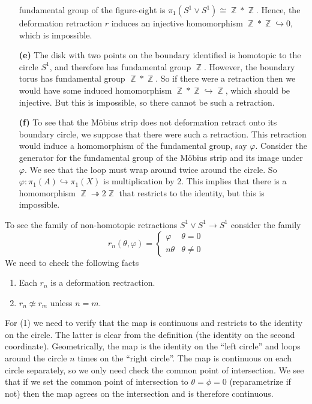 \documentclass{article}
\DeclareMathOperator{\Z}{\mathbb{Z}}
\DeclareMathOperator{\into}{\hookrightarrow}
\DeclareMathOperator{\onto}{\twoheadrightarrow}
\newcommand{\exercise}[1]{\noindent{\textbf{Exercise #1:}}}
\begin{document}
\begin{enumerate}
  fundamental group of the figure-eight is $\pi_1(S^1 \vee S^1) \cong
  \Z \ast \Z$. Hence, the deformation retraction $r$ induces an
  injective homomorphism $\Z \ast \Z \into 0$, which is impossible.
\item[\textbf{(e)}] The disk with two points on the boundary
  identified is homotopic to the circle $S^1$, and therefore has
  fundamental group $\Z$. However, the boundary torus has fundamental
  group $\Z \ast \Z$. So if there were a retraction then we would have
  some induced homomorphism $\Z \ast \Z \into \Z$, which should be
  injective. But this is impossible, so there cannot be such a
  retraction.
\item[\textbf{(f)}] To see that the M\"{o}bius strip does not
  deformation retract onto its boundary circle, we suppose that there
  were such a retraction. This retraction would induce a homomorphism
  of the fundamental group, say $\varphi$. Consider the generator for
  the fundamental group of the M\"{o}bius strip and its image under
  $\varphi$. We see that the loop must wrap around twice around the
  circle. So $\varphi: \pi_1(A) \into \pi_1(X)$ is multiplication by
  2. This implies that there is a homomorphism $\Z \onto 2\Z$ that
  restricts to the identity, but this is impossible.
\end{enumerate}

\exercise{1.1.17}

To see the family of non-homotopic retractions $S^1 \vee S^1 \to
S^1$ consider the family
\[
r_n(\theta,\varphi) =
\begin{cases}
  \varphi & \theta = 0 \\
  n\theta & \theta \neq 0
\end{cases}
\]
We need to check the following facts
\begin{enumerate}
\item Each $r_n$ is a deformation rectraction.
\item $r_n \not\simeq r_m$ unless $n = m$.
\end{enumerate}
For (1) we need to verify that the map is continuous and restricts to
the identity on the circle. The latter is clear from the definition
(the identity on the second coordinate). Geometrically, the map is the
identity on the ``left circle'' and loops around the circle $n$ times
on the ``right circle''. The map is continuous on each circle
separately, so we only need check the common point of intersection. We
see that if we set the common point of intersection to $\theta = \phi
= 0$ (reparametrize if not) then the map agrees on the intersection
and is therefore continuous.
\end{document}
